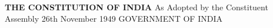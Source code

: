 \begin{titlepage} 
\centering 
\vspace*{3cm} 
{\Huge\bfseries THE CONSTITUTION OF INDIA} 
\vspace{2cm} 
{\large As Adopted by the Constituent Assembly} 
\vspace{0.5cm} 
{\large 26th November 1949} 
\vfill 
{\large GOVERNMENT OF INDIA} 
\end{titlepage} 
\newpage 
